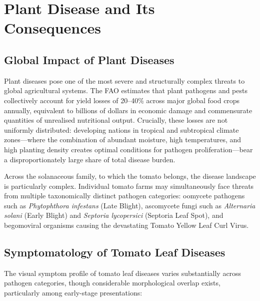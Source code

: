 \documentclass[12pt,a4paper]{report}
\begin{document}
\section{Plant Disease and Its Consequences}

\subsection{Global Impact of Plant Diseases}

Plant diseases pose one of the most severe and structurally complex threats to global agricultural systems. The FAO estimates that plant pathogens and pests collectively account for yield losses of 20--40\% across major global food crops annually, equivalent to billions of dollars in economic damage and commensurate quantities of unrealised nutritional output. Crucially, these losses are not uniformly distributed: developing nations in tropical and subtropical climate zones---where the combination of abundant moisture, high temperatures, and high planting density creates optimal conditions for pathogen proliferation---bear a disproportionately large share of total disease burden.

Across the solanaceous family, to which the tomato belongs, the disease landscape is particularly complex. Individual tomato farms may simultaneously face threats from multiple taxonomically distinct pathogen categories: oomycete pathogens such as \textit{Phytophthora infestans} (Late Blight), ascomycete fungi such as \textit{Alternaria solani} (Early Blight) and \textit{Septoria lycopersici} (Septoria Leaf Spot), and begomoviral organisms causing the devastating Tomato Yellow Leaf Curl Virus.

\subsection{Symptomatology of Tomato Leaf Diseases}

The visual symptom profile of tomato leaf diseases varies substantially across pathogen categories, though considerable morphological overlap exists, particularly among early-stage presentations:
\end{document}
